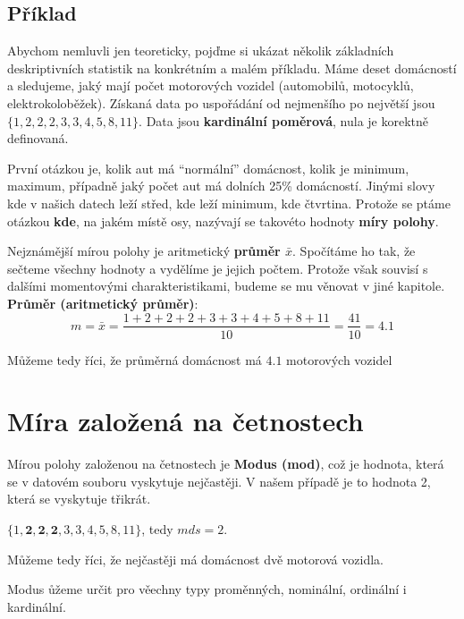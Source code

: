 \documentclass[
  czech,
  11pt,
  letterpaper,
  DIV=11,
  numbers=noendperiod]{scrreprt}
\begin{document}
\subsection*{Příklad}\label{pux159uxedklad}

Abychom nemluvli jen teoreticky, pojďme si ukázat několik základních
deskriptivních statistik na konkrétním a malém příkladu. Máme deset
domácností a sledujeme, jaký mají počet motorových vozidel (automobilů,
motocyklů, elektrokoloběžek). Získaná data po uspořádání od nejmenšího
po největší jsou \(\{1, 2, 2, 2, 3, 3, 4, 5, 8, 11\}\). Data jsou
\textbf{kardinální poměrová}, nula je korektně definovaná.

První otázkou je, kolik aut má ``normální'' domácnost, kolik je minimum,
maximum, případně jaký počet aut má dolních 25\% domácností. Jinými
slovy kde v našich datech leží střed, kde leží minimum, kde čtvrtina.
Protože se ptáme otázkou \textbf{kde}, na jakém místě osy, nazývají se
takovéto hodnoty \textbf{míry polohy}.

Nejznámější mírou polohy je aritmetický \textbf{průměr \(\bar{x}\)}.
Spočítáme ho tak, že sečteme všechny hodnoty a vydělíme je jejich
počtem. Protože však souvisí s dalšími momentovými charakteristikami,
budeme se mu věnovat v jiné kapitole. \textbf{Průměr (aritmetický
průměr)}: \[
   m = \bar{x}= \frac{1 + 2 + 2 + 2 + 3 + 3 + 4 + 5 + 8 + 11}{10} = \frac{41}{10} = 4.1
   \]

Můžeme tedy říci, že průměrná domácnost má \(4.1\) motorových vozidel

\section{Míra založená na
četnostech}\label{muxedra-zaloux17eenuxe1-na-ux10detnostech}

Mírou polohy založenou na četnostech je \textbf{Modus (mod)}, což je
hodnota, která se v datovém souboru vyskytuje nejčastěji. V našem
případě je to hodnota 2, která se vyskytuje třikrát.

\(\{1, \mathbf{ 2, 2, 2}, 3, 3, 4, 5, 8, 11\}\), tedy \(mds=2\).

Můžeme tedy říci, že nejčastěji má domácnost dvě motorová vozidla.

\begin{tcolorbox}[enhanced jigsaw, arc=.35mm, bottomrule=.15mm, bottomtitle=1mm, breakable, colback=white, colbacktitle=quarto-callout-note-color!10!white, colframe=quarto-callout-note-color-frame, coltitle=black, left=2mm, leftrule=.75mm, opacityback=0, opacitybacktitle=0.6, rightrule=.15mm, title=\textcolor{quarto-callout-note-color}{\faInfo}\hspace{0.5em}{Poznámka}, titlerule=0mm, toprule=.15mm, toptitle=1mm]

Modus ůžeme určit pro věechny typy proměnných, nominální, ordinální i
kardinální.

\end{tcolorbox}
\end{document}
